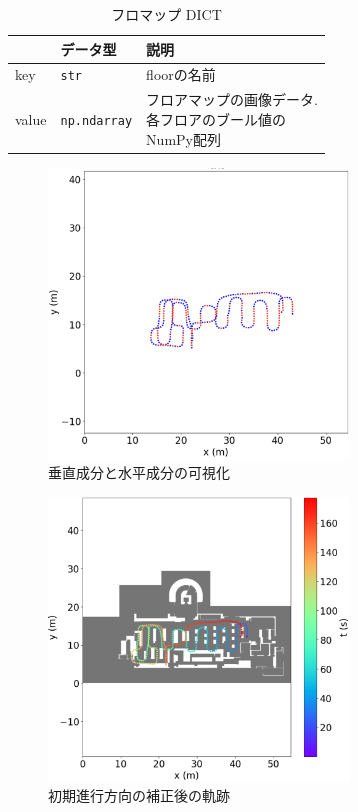 \begin{table}[ht]
	\caption{フロマップ DICT}
	\centering
	\begin{tabular}{lll}
		\hline
		      & \textbf{データ型}       & \textbf{説明}             \\ \hline
		key   & \texttt{str}        & floorの名前                \\ \hline
		value & \texttt{np.ndarray} & \makecell{フロアマップの画像データ. \\各フロアのブール値の\\NumPy配列} \\ \hline
	\end{tabular}
	\label{tab:map-dict}
\end{table}

\begin{figure}[ht]
	\centering
	\includegraphics[width=80mm]{image/rb.jpg}
	\caption{垂直成分と水平成分の可視化}    \label{fig:color}
\end{figure}

\begin{figure}[ht]
	\centering
	\includegraphics[width=80mm]{image/pdr-rotate.jpg}
	\caption{初期進行方向の補正後の軌跡}    \label{fig:pdr-rotate}
\end{figure}




